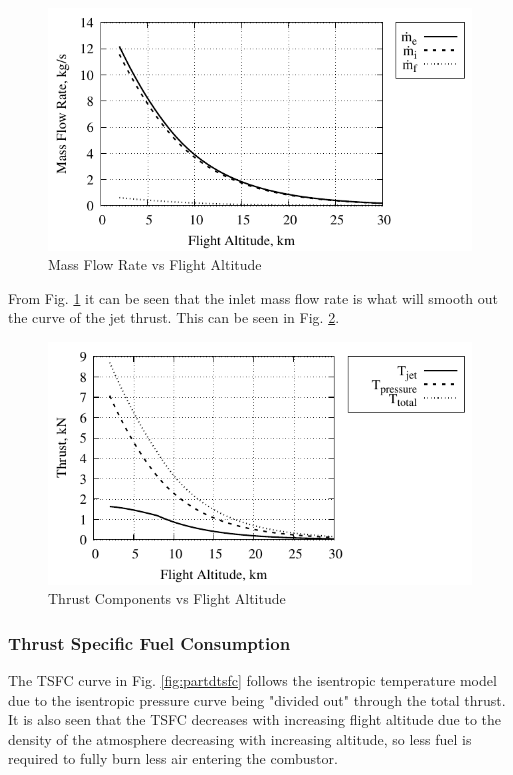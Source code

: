 \documentclass[conf]{new-aiaa} %
\begin{document}
\begin{figure}[H] %
    \centering
    \includegraphics[]{media/performance_parameter_files/part_d_mass_flow_rate.pdf}
    \caption{\label{fig:partdmassflowrate}Mass Flow Rate vs Flight Altitude}
\end{figure}
From Fig. \ref{fig:partdmassflowrate} it can be seen that the inlet mass flow rate is what will smooth out the curve of the jet thrust. This can be seen in Fig. \ref{fig:partdallthrust}.

\begin{figure}[H] %
    \centering
    \includegraphics[]{media/performance_parameter_files/part_d_all_thrust.pdf}
    \caption{\label{fig:partdallthrust}Thrust Components vs Flight Altitude}
\end{figure}

\subsubsection{Thrust Specific Fuel Consumption}
The TSFC curve in Fig. \ref{fig:partdtsfc} follows the isentropic temperature model due to the isentropic pressure curve being "divided out" through the total thrust. It is also seen that the TSFC decreases with increasing flight altitude due to the density of the atmosphere decreasing with increasing altitude, so less fuel is required to fully burn less air entering the combustor.
\end{document}
